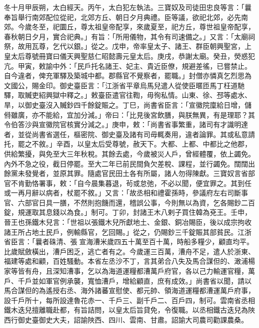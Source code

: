 \begin{pinyinscope}
 冬十月甲辰朔，太白經天。丙午，太白犯左執法。三寶奴及司徒田忠良等言：「曩奉旨舉行南郊配位從祀，北郊方丘、朝日夕月典禮。臣等議，欲祀北郊，必先南郊。今歲冬至，祀圜丘，尊太祖皇帝配享，來歲夏至，祀方丘，尊世祖皇帝配享，春秋朝日夕月，實合祀典。」有旨：「所用儀物，其令有司速備之。」又言：「太廟祠祭，故用瓦尊，乞代以銀。」從之。戊申，帝率皇太子、諸王、群臣朝興聖宮，上皇太后尊號冊寶曰儀天興聖慈仁昭懿壽元皇太后。庚戌，恭謝太廟。癸丑，熒惑犯亢。甲寅，敕諭中外：「民戶托名諸王、妃主、貴近臣僚，規避差徭，已嘗禁止。自今違者，俾充軍驛及築城中都。郡縣官不覺察者，罷職。」封僧亦憐真乞烈思為文國公，賜金印。御史臺臣言：「江浙省平章烏馬兒遣人從使臣暱匝馬丁枉道馳驛，取贓吏紹興獄中釋之。」敕臺臣遣官往鞫，毋徇私情。山東、徐、邳等處水、旱，以御史臺沒入贓鈔四千餘錠賑之。丁巳，尚書省臣言：「宣徽院廩給日增，儲偫雖廣，亦不能給，宜加分減。」帝曰：「比見後宮飲膳，與朕無異，有是理耶？其令伯答沙與宣徽院官核實分減之。」庚申，敕：「尚書省事繁重，諸司有才識明達者，並從尚書省選任，樞密院、御史臺及諸有司毋輒奏用，違者論罪。其或私意請托，罷之不敘。」辛酉，以皇太后受尊號，赦天下。大都、上都、中都比之他郡，供給繁擾，與免至大三年秋稅。其餘去處，今歲被災人戶，曾經體覆，依上蠲免。內外不急之役，截日停罷。至大二年已前民間負欠差稅、課程，並行蠲免。闊闊出餘黨未發覺者，並原其罪。隨處官民田土各有所屬，諸人勿得陳獻。三寶奴言省部官不肯勤恪署事，敕：「自今晨集暮退，茍或怠弛，不必以聞，便宜罪之。其到任或一再月辭以病者，杖罷不敘。」又言：「故丞相和禮霍孫時，參議府左右司斷事官、六部官日具一膳，不然則抱饑而還，稽誤公事，今則無以為資，乞各賜鈔二百錠，規運取其息錢以為食。」制可。丁卯，封諸王木八剌子買住韓為兗王。壬申，晉王也孫鐵木兒言：「世祖以張鐵木兒所獻地土、金銀、銅冶賜臣，後以成宗拘收諸王所占地土民戶，例輸縣官，乞回賜。」從之，仍賜鈔三千錠賑其部貧民。江浙省臣言：「曩者硃清、張宣海漕米歲四五十萬至百十萬，時船多糧少，顧直均平。比歲賦斂橫出，漕戶困乏，逃亡者有之。今歲運三百萬，漕舟不足，遣人於浙東、福建等處和顧，百姓騷動。本省左丞沙不丁，言其弟合八失及馬合謀但的、澉浦楊家等皆有舟，且深知漕事，乞以為海道運糧都漕萬戶府官，各以己力輸運官糧，萬戶、千戶並如軍官例承襲，寬恤漕戶，增給顧直，庶有成效。」尚書省以聞，請以馬合謀但的為遙授右丞、海外諸蕃宣慰使、都元帥、領海道運糧都漕運萬戶府事，設千戶所十，每所設達魯花赤一、千戶三、副千戶二、百戶四，制可。雲南省丞相鐵木迭兒擅離職赴都，有旨詰問，以皇太后旨貸免，令復職。以丞相鐵古迭兒為陜西行御史臺御史大夫，詔諭陜西、四川、雲南、甘肅。詔諭大司農司勸課農桑。




\end{pinyinscope}
